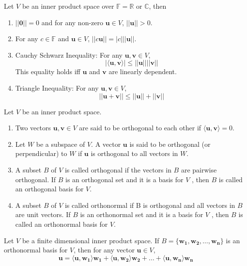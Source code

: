 \documentclass[a4paper]{article}
\begin{document}
\begin{thm}
Let $V$ be an inner product space over $\mathbb{F}=\mathbb{R}$ or $\mathbb{C}$, then
\begin{enumerate}
    \item $||\boldsymbol{0}||=0$ and for any non-zero $\mathbf{u}\in V$, $||\mathbf{u}||>0$.
    \item For any $c\in\mathbb{F}$ and $\mathbf{u}\in V$, $||c\mathbf{u}||=|c|||\mathbf{u}||$.
    \item Cauchy Schwarz Inequality: For any $\mathbf{u},\mathbf{v}\in V$, $$|\langle\mathbf{u},\mathbf{v}\rangle|\leq||\mathbf{u}||||\mathbf{v}||$$
    This equality holds iff $\mathbf{u}$ and $\mathbf{v}$ are linearly dependent.
    \item Triangle Inequality: For any $\mathbf{u},\mathbf{v}\in V$, $$||\mathbf{u}+\mathbf{v}||\leq||\mathbf{u}||+||\mathbf{v}||$$
\end{enumerate}
\end{thm}
\begin{defi}
Let $V$ be an inner product space.
\begin{enumerate}
\item Two vectors $\mathbf{u},\mathbf{v}\in V$ are said to be orthogonal to each other if $\langle\mathbf{u},\mathbf{v}\rangle = 0$. 
\item Let $W$ be a subspace of $V$. A vector $\mathbf{u}$ is said to be orthogonal (or perpendicular) to $W$ if $\mathbf{u}$ is orthogonal to all vectors in $W$.
\item A subset $B$ of $V$ is called orthogonal if the vectors in $B$ are pairwise orthogonal. If $B$ is an orthogonal set and it is a basis for $V$ , then $B$ is called an orthogonal basis for $V$.
\item A subset $B$ of $V$ is called orthonormal if B is orthogonal and all vectors in $B$ are unit vectors. If $B$ is an orthonormal set and it is a basis for $V$ , then $B$ is called an orthonormal basis for $V$.
\end{enumerate}
\end{defi}
\begin{thm}
Let $V$ be a finite dimensional inner product space. If $B =\{\mathbf{w_1},\mathbf{w_2},\dots,\mathbf{w_n}\}$ is an orthonormal basis for $V$, then for any vector $\mathbf{u}\in V$,
$$\mathbf{u} = \langle\mathbf{u},\mathbf{w_1}\rangle\mathbf{w_1} +\langle\mathbf{u},\mathbf{w_2}\rangle\mathbf{w_2} +\dots+\langle\mathbf{u},\mathbf{w_n}\rangle\mathbf{w_n}$$
\end{thm}
\end{document}
